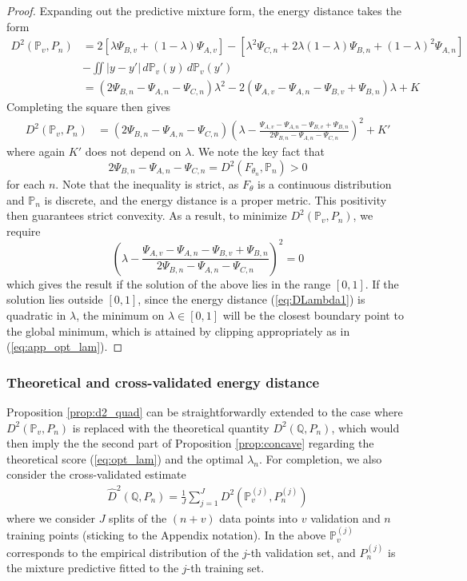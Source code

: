 \documentclass[11pt,a4paper]{article}
\theoremstyle{plain}
\theoremstyle{remark}
\theoremstyle{remark}
\begin{document}
\begin{proof}
Expanding out the predictive mixture form, the energy distance takes the form
\begin{align*}
     D^2(\mathbb{P}_{v},P_n)&= 2\left[\lambda\Psi_{B,v} + (1-\lambda)\Psi_{A,v}\right] -\left[\lambda^2 \Psi_{C,n} +2\lambda(1-\lambda)\Psi_{B,n}+\left(1-\lambda\right)^2 \Psi_{A,n}\right]\nonumber\\
     &- \iint |y-y'| \, d\mathbb{P}_{v}(y) \, d\mathbb{P}_v(y')\\
    &= (2\Psi_{B,n}-\Psi_{A,n} -\Psi_{C,n})\lambda^2 - 2(\Psi_{A,v}-\Psi_{A,n}-\Psi_{B,v}+\Psi_{B,n})\lambda + K 
    \end{align*}
Completing the square then gives
\begin{align*}
   D^2(\mathbb{P}_{v},P_n) &= (2\Psi_{B,n} -\Psi_{A,n}-\Psi_{C,n}) \left(\lambda-\frac{\Psi_{A,v} -\Psi_{A,n}-\Psi_{B,v}+\Psi_{B,n}}{2\Psi_{B,n}-\Psi_{A,n}-\Psi_{C,n}}\right)^2 \nonumber + K'
\end{align*}
where again $K'$ does not depend on $\lambda$.  We note the key fact that
$$2\Psi_{B,n}-\Psi_{A,n}-\Psi_{C,n}=D^2(F_{\theta_n},\mathbb{P}_n) > 0$$
for each $n$. Note that the inequality is strict, as $F_{\theta}$ is a continuous distribution and $\mathbb{P}_n$ is discrete, and the energy distance is a proper metric. This positivity then guarantees strict convexity. As a result, to minimize $D^2(\mathbb{P}_v, P_n)$, we require 
$$
 \left( \lambda -\frac{\Psi_{A,v}-\Psi_{A,n}-\Psi_{B,v}+\Psi_{B,n}}{2\Psi_{B,n}-\Psi_{A,n}-\Psi_{C,n}}\right)^2  = 0
$$
which gives the result if the solution of the above lies in the range $[0,1]$. If the solution lies outside $[0,1]$, since the energy distance (\ref{eq:DLambda1}) is quadratic in $\lambda$, the minimum on $\lambda \in [0,1]$ will be the closest boundary point to the global minimum, which is attained by clipping appropriately as in (\ref{eq:app_opt_lam}).
\end{proof}

\subsubsection{Theoretical and cross-validated energy distance}
 Proposition \ref{prop:d2_quad} can be straightforwardly extended to the case where $D^2(\mathbb{P}_v,P_n)$ is replaced with the theoretical quantity $D^2(\mathbb{Q},P_n)$, which would then imply the the second part of Proposition \ref{prop:concave} regarding the theoretical score (\ref{eq:opt_lam}) and the optimal $\lambda_n$. For completion, we also consider the cross-validated estimate
 \begin{align*}
   \widehat{D}^2(\mathbb{Q},P_n) = \frac{1}{J}\sum_{j = 1}^J D^2\left(\mathbb{P}_{v}^{(j)},P_{n}^{(j)} \right)
 \end{align*}
 where we consider $J$ splits of the $(n+v)$ data points into $v$ validation and $n$ training points (sticking to the Appendix notation). In the above $\mathbb{P}_{v}^{(j)}$ corresponds to the empirical distribution of the $j$-th validation set, and $P_{n}^{(j)}$ is the mixture predictive fitted to the $j$-th training set. 
\end{document}
